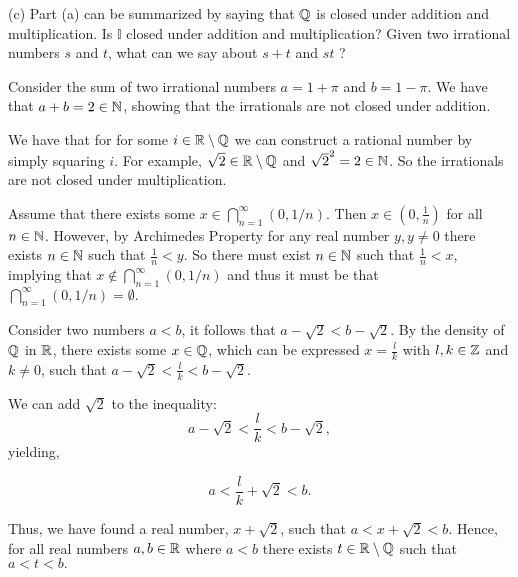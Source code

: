 \documentclass{report}
\begin{document}
\par \bigskip
(c) Part (a) can be summarized by saying that $\QQ$ is closed under addition and multiplication. Is $\mathbb{I}$ closed under addition and multiplication? Given two irrational numbers $s$ and $t$, what can we say about $s+t$ and $s t$ ?
\smallskip
\par
\sol 

Consider the sum of two irrational numbers $a = 1 + \pi$ and $b = 1 - \pi.$ We have that $a + b = 2 \in \NN$, showing that the irrationals are not closed under addition.
\par
We have that for for some  $i \in \RR \setminus \QQ$ we can construct a rational number by simply squaring $i.$ For example, $\sqrt{2} \in \RR \setminus \QQ$ and $\sqrt{2}^2= 2 \in \NN$. So the irrationals are not closed under multiplication.

\par \bigskip


Assume that there exists some $x \in \bigcap_{n=1}^{\infty}(0,1 / n).$ Then $ x \in (0, \frac{1}{n})$ for all $n \in \NN$.  However, by Archimedes Property for any real number  $y, y\not= 0$ there exists $n \in \NN$ such that $\frac{1}{n} < y$. So there must exist $n \in \NN$ such that $\frac{1}{n} < x$, implying that $x \not\in \bigcap_{n=1}^{\infty}(0,1 / n)$ and thus it must be that $\bigcap_{n=1}^{\infty}(0,1 / n) = \emptyset.$


\sol Consider two numbers $a <b$, it follows that $a - \sqrt{2} < b - \sqrt{2}.$ By the density of $\QQ$ in $\RR$, there exists some $x \in \QQ$, which can be expressed $x= \frac{l}{k}$ with $l,k \in \ZZ$ and $k \neq 0$, such that $a - \sqrt{2} < \frac{l}{k}< b - \sqrt{2}$.

We can add $\sqrt{2}$ to the inequality:
$$
a - \sqrt{2} < \frac{l}{k}< b - \sqrt{2}
,$$ yielding, 

$$
a < \frac{l}{k}+ \sqrt{2} < b 
.$$ 

Thus, we have found a real number, $x + \sqrt{2}$, such that $a < x + \sqrt{2}< b.$ Hence, for all real numbers $a, b \in \RR$ where $a < b$ there exists $t \in \RR \setminus \QQ$ such that $a<t<b.$
\end{document}

